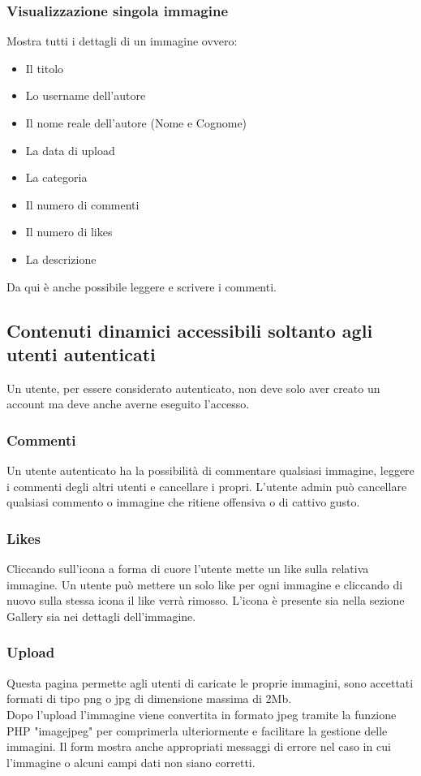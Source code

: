 \documentclass[openany, a4paper, 12pt]{report}
\begin{document}
		\subsubsection{Visualizzazione singola immagine}
		Mostra tutti i dettagli di un immagine ovvero:
		\begin{itemize}
					\item Il titolo
					\item Lo username dell'autore
					\item Il nome reale dell'autore (Nome e Cognome)
					\item La data di upload
					\item La categoria
					\item Il numero di commenti
					\item Il numero di likes
					\item La descrizione
		\end{itemize}
		Da qui è anche possibile leggere e scrivere i commenti.
				
	\subsection{Contenuti dinamici accessibili soltanto agli utenti autenticati}
	Un utente, per essere considerato autenticato, non deve solo aver creato un account ma deve anche averne eseguito l'accesso.
	
		\subsubsection{Commenti}
		Un utente autenticato ha la possibilità di commentare qualsiasi immagine, leggere i commenti degli altri utenti e cancellare i propri. L'utente admin può cancellare qualsiasi commento o immagine che ritiene offensiva o di cattivo gusto.
		
		\subsubsection{Likes}
		Cliccando sull'icona a forma di cuore l'utente mette un like sulla relativa immagine. Un utente può mettere un solo like per ogni immagine e cliccando di nuovo sulla stessa icona il like verrà rimosso.
		L'icona è presente sia nella sezione Gallery sia nei dettagli dell'immagine.

		\subsubsection{Upload}
		Questa pagina permette agli utenti di caricate le proprie immagini, sono accettati formati di tipo png o jpg di dimensione massima di 2Mb.\\
		Dopo l'upload l'immagine viene convertita in formato jpeg tramite la funzione PHP "imagejpeg" per comprimerla ulteriormente e facilitare la gestione delle immagini. Il form mostra anche appropriati messaggi di errore nel caso in cui l'immagine o alcuni campi dati non siano corretti.
		
\end{document}
